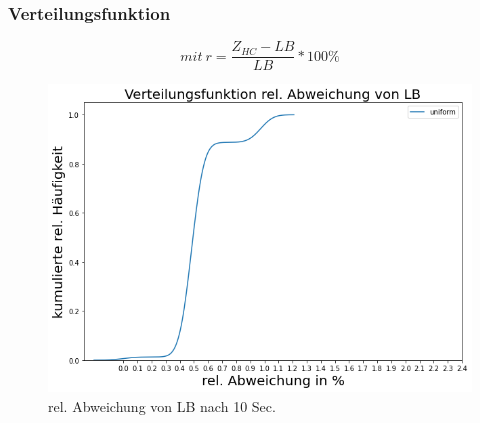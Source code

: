\documentclass{beamer}
\begin{document}
\begin{frame}

\frametitle{Verteilungsfunktion}

\begin{footnotesize}
\begin{equation}
mit \ r = \frac{Z_{HC}-LB}{LB} * 100\%
\end{equation}
\end{footnotesize}

\begin{figure}[!htbp]
\begin{center}
\includegraphics[scale=0.3]{img/dist.png}
\end{center}
\caption{rel. Abweichung von LB nach 10 Sec.}
\label{fig:architecture}
\end{figure}



\end{frame}
\end{document}
